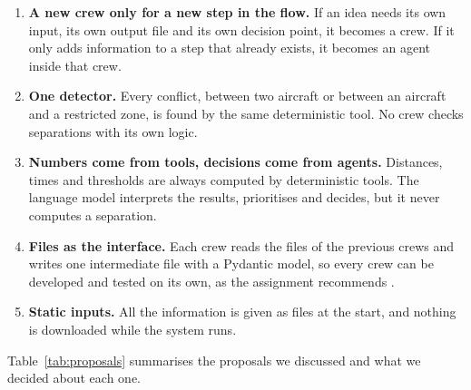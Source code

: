 \begin{enumerate}
  \item \textbf{A new crew only for a new step in the flow.} If an idea needs its own input, its own output file and its own decision point, it becomes a crew. If it only adds information to a step that already exists, it becomes an agent inside that crew.
  \item \textbf{One detector.} Every conflict, between two aircraft or between an aircraft and a restricted zone, is found by the same deterministic tool. No crew checks separations with its own logic.
  \item \textbf{Numbers come from tools, decisions come from agents.} Distances, times and thresholds are always computed by deterministic tools. The language model interprets the results, prioritises and decides, but it never computes a separation.
  \item \textbf{Files as the interface.} Each crew reads the files of the previous crews and writes one intermediate file with a Pydantic model, so every crew can be developed and tested on its own, as the assignment recommends \cite{mas_assignment}.
  \item \textbf{Static inputs.} All the information is given as files at the start, and nothing is downloaded while the system runs.
\end{enumerate}

Table~\ref{tab:proposals} summarises the proposals we discussed and what we
decided about each one.

